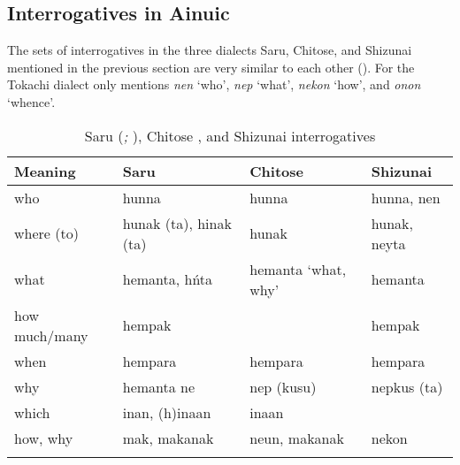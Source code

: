 \subsection{Interrogatives in Ainuic}\label{sec:5.1.3}

The sets of interrogatives in the three dialects Saru, Chitose, and Shizunai mentioned in the previous section are very similar to each other (). For the Tokachi dialect \citet{Takahashi2013} only mentions \textit{nen} ‘who’, \textit{nep} ‘what’, \textit{nekon} ‘how’, and \textit{onon} ‘whence’.

\begin{table}[p]
\caption{Saru (\citealt{Tamura2000}\emph{\textup{;}} \citealt{NINJAL2015}), Chitose \citep{Bugaeva2004}, and Shizunai interrogatives \citep{Refsing1986}}
\label{tab:ainu:2}

\begin{tabularx}{\textwidth}{llQl}
\lsptoprule

\textbf{Meaning} & \textbf{Saru} & \textbf{Chitose} & \textbf{Shizunai}\\
\midrule
who & hunna & hunna & hunna, nen\\
where (to) & hunak (ta), hinak (ta) & hunak & hunak, neyta\\
what & hemanta, hńta & hemanta ‘what, why’ & hemanta\\
how much/many & hempak &  & hempak\\
when & hempara & hempara & hempara\\
why & hemanta ne & nep (kusu) & nepkus (ta)\\
which & inan, (h)inaan & inaan & \\
how, why & mak, makanak & neun, makanak & nekon\\
\lspbottomrule
\end{tabularx}
\end{table}

